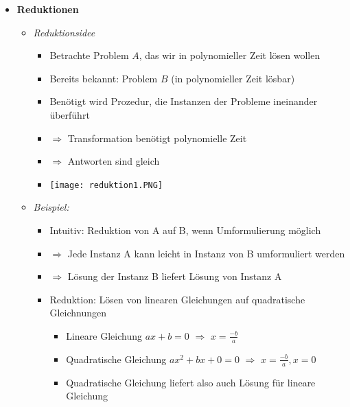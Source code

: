 \begin{itemize}
            \item \textbf{Reduktionen}
                \begin{itemize}
                    \item \textit{Reduktionsidee}
                        \begin{itemize}
                            \item Betrachte Problem $A$, das wir in polynomieller Zeit lösen wollen
                            \item Bereits bekannt: Problem $B$ (in polynomieller Zeit lösbar)
                            \item Benötigt wird Prozedur, die Instanzen der Probleme ineinander überführt
                            \item[] $\Rightarrow$ Transformation benötigt polynomielle Zeit
                            \item[] $\Rightarrow$ Antworten sind gleich
                            \item[] \texttt{[image: reduktion1.PNG]} 
                        \end{itemize}

                    \item \textit{Beispiel:}
                        \begin{itemize}
                            \item Intuitiv: Reduktion von A auf B, wenn Umformulierung möglich
                            \item[] $\Rightarrow$ Jede Instanz A kann leicht in Instanz von B umformuliert werden
                            \item[] $\Rightarrow$ Lösung der Instanz B liefert Lösung von Instanz A
                            \item Reduktion: Lösen von linearen Gleichungen auf quadratische Gleichnungen
                                \begin{itemize}
                                    \item Lineare Gleichung $ax + b = 0$ $\Rightarrow$ $x= \frac{-b}{a}$
                                    \item Quadratische Gleichung $ax^2 + bx + 0 = 0$ $\Rightarrow$ $x = \frac{-b}{a}, x = 0$
                                    \item Quadratische Gleichung liefert also auch Lösung für lineare Gleichung
                                \end{itemize}
                        \end{itemize}


\end{itemize}
\end{itemize}
